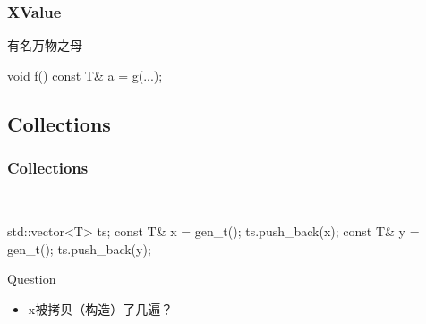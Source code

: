 \documentclass[UTF8,lualatex]{ctexbeamer}
\begin{document}

\begin{frame}[fragile]
    \frametitle{XValue}
    \begin{exampleblock}{有名万物之母}
        \begin{cppcode}
            void f() {
                const T& a = g(...);
            }
        \end{cppcode}
    \end{exampleblock}
\end{frame}


\subsection{Collections}

\begin{frame}[fragile]
    \frametitle{Collections}
    \begin{exampleblock}{~}
        \begin{cppcode}
            std::vector<T> ts;
            const T& x = gen_t();
            ts.push_back(x);
            const T& y = gen_t();
            ts.push_back(y);
        \end{cppcode}
    \end{exampleblock}
    \begin{block}{Question}
        \begin{itemize}
        \item x被拷贝（构造）了几遍？
        \end{itemize}
    \end{block}
\end{frame}

\end{document}
